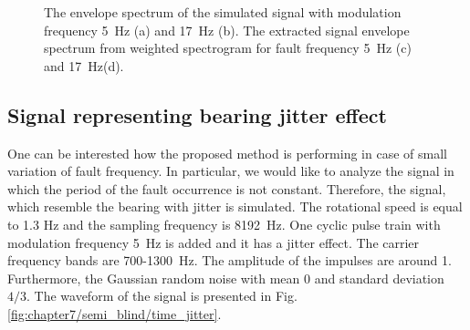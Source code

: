 \begin{figure}[!ht]
\begin{subfigure}[b]{0.49\textwidth}
    \end{subfigure}
    \vspace{\baselineskip}
    \caption{The envelope spectrum of the simulated signal with modulation frequency 5~Hz (a) and 17~Hz (b). The extracted signal envelope spectrum from weighted spectrogram for fault frequency 5~Hz (c) and 17~Hz(d). }
    \label{fig:chapter7/semi_blind/widmo_comp_comparison_sim}
\end{figure}
\subsection{Signal representing bearing jitter effect}
One can be interested how the proposed method is performing in case of small variation of fault frequency. In particular, we would like to analyze the signal in which the period of the fault occurrence is not constant. Therefore, the signal, which resemble the bearing with jitter is simulated. The rotational speed is equal to 1.3 Hz and the sampling frequency is 8192~Hz. One cyclic pulse train with modulation frequency 5~Hz is added and it has a jitter effect. The carrier frequency bands are 700-1300~Hz. The amplitude of the impulses are around 1. Furthermore, the Gaussian random noise with mean 0 and standard deviation $4/3$. The waveform of the signal is presented in Fig. \ref{fig:chapter7/semi_blind/time_jitter}. 
